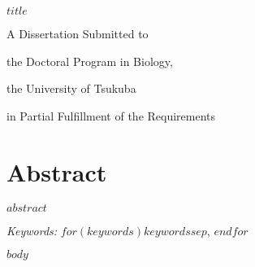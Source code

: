 \documentclass[12pt, a4paper]{report} %
\begin{document}
\def\spacingset#1{\renewcommand{\baselinestretch}%
{#1}\small\normalsize} \spacingset{1}


%


    \thispagestyle{empty}
    \vspace*{30mm}
    \begin{center}
    \LARGE{\bf $title$}
    \end{center}

    \vspace{6cm}
    \centerline{A Dissertation Submitted to}\par
    \centerline{the Doctoral Program in Biology,}\par
    \centerline{the University of Tsukuba}\par
    \centerline{in Partial Fulfillment of the Requirements}\par



\newpage

\chapter*{Abstract}
$abstract$

\noindent%
{\it Keywords:} $for(keywords)$$keywords$$sep$, $endfor$
\vfill

\newpage
\spacingset{1.45} %

$body$



\end{document}

